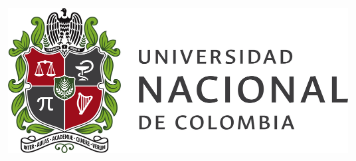 \documentclass[a0,portrait]{a0poster}
\begin{document}
	\pagestyle{empty}
        \begin{center}
        \hspace{-3cm}
        \begin{minipage}{.20\columnwidth}
            \vspace{3.5cm} %
            \includegraphics[width=9cm, height=6cm]{logo.png}
        \end{minipage}%
        \hspace{-7cm}
	\begin{minipage}{.80\columnwidth}
        \vspace{3.5cm}
        \end{minipage}            
        \end{center}
\end{document}
